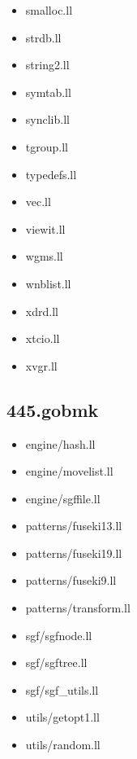 \begin{multicols}{3}
\begin{itemize}
		\item smalloc.ll
		\item strdb.ll
		\item string2.ll
		\item symtab.ll
		\item synclib.ll
		\item tgroup.ll
		\item typedefs.ll
		\item vec.ll
		\item viewit.ll
		\item wgms.ll
		\item wnblist.ll
		\item xdrd.ll
		\item xtcio.ll
		\item xvgr.ll
	\end{itemize}

	\subsection{445.gobmk}
	\begin{itemize}
		\item engine/hash.ll
		\item engine/movelist.ll
		\item engine/sgffile.ll
		\item patterns/fuseki13.ll
		\item patterns/fuseki19.ll
		\item patterns/fuseki9.ll
		\item patterns/transform.ll
		\item sgf/sgfnode.ll
		\item sgf/sgftree.ll
		\item sgf/sgf\_utils.ll
		\item utils/getopt1.ll
		\item utils/random.ll
	\end{itemize}


\end{multicols}
